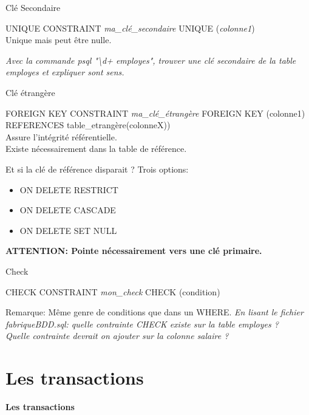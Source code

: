 \documentclass[xetex,dvipsnames]{beamer}
\begin{document}
\begin{frame}{Clé Secondaire}
	\begin{alertblock}{UNIQUE}
		CONSTRAINT \textit{ma\_clé\_secondaire} UNIQUE (\textit{colonne1})\\
		Unique mais peut être nulle.
	\end{alertblock}
	\textit{Avec la commande psql "\textbackslash d+ employes", trouver une clé secondaire de la table employes et expliquer sont sens.}\\	
\end{frame}

\begin{frame}{Clé étrangère}
	\begin{alertblock}{FOREIGN KEY}
		CONSTRAINT \textit{ma\_clé\_étrangère} FOREIGN KEY (colonne1) REFERENCES table\_etrangère(colonneX))\\
		Assure l'intégrité référentielle.\\
		Existe nécessairement dans la table de référence.
	\end{alertblock}
	\begin{block}{Et si la clé de référence disparait ?}
		Trois options:
		\begin{itemize}
			\item ON DELETE RESTRICT
			\item ON DELETE CASCADE
			\item ON DELETE SET NULL
		\end{itemize}
		\textbf{ATTENTION: Pointe nécessairement vers une clé primaire.}				
	\end{block}
\end{frame}


\begin{frame}{Check}
	\begin{alertblock}{CHECK}
		CONSTRAINT \textit{mon\_check} CHECK (condition)\\
	\end{alertblock}
	Remarque: Même genre de conditions que dans un WHERE.
	\vspace*{1em}
	\textit{En lisant le fichier fabriqueBDD.sql: quelle contrainte CHECK existe sur la table employes ?}\\
	\textit{Quelle contrainte devrait on ajouter sur la colonne salaire ?}\\
\end{frame}




\section{Les transactions}
\begin{frame}
\begin{center}
{\LARGE \textbf{Les transactions}}
\end{center}
\end{frame}
\end{document}
